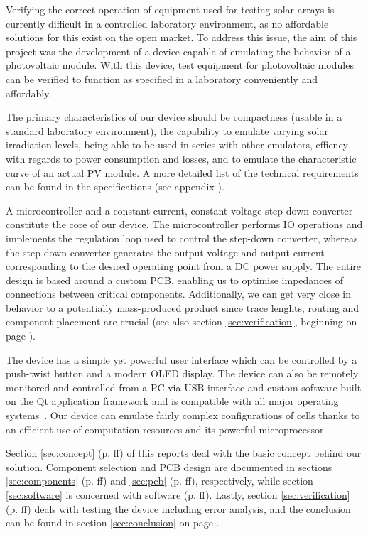 

Verifying the correct operation of equipment  used for testing solar arrays is
currently difficult in  a controlled laboratory environment,  as no affordable
solutions for this exist on the open market. To address this issue, the aim of
this project was the development of a device capable of emulating the behavior
of a  photovoltaic module. With this  device, test equipment  for photovoltaic
modules can be verified to function  as specified in a laboratory conveniently
and affordably.

The primary characteristics  of our device should be compactness  (usable in a
standard  laboratory environment),  the  capability to  emulate varying  solar
irradiation levels,  being able  to be  used in  series with  other emulators,
effiency with  regards to  power consumption  and losses,  and to  emulate the
characteristic  curve of  an actual  PV module. A  more detailed  list of  the
technical  requirements  can be  found  in  the specifications  (see  appendix
). %

A microcontroller and a constant-current, constant-voltage step-down converter
constitute the core of our device.  The microcontroller performs IO operations
and implements  the regulation loop  used to control the  step-down converter,
whereas  the  step-down converter  generates  the  output voltage  and  output
current  corresponding  to  the  desired  operating  point  from  a  DC  power
supply. The  entire design  is  based  around a  custom  PCB,  enabling us  to
optimise impedances of  connections between critical components. Additionally,
we can get very close in behavior to a potentially mass-produced product since
trace lenghts, routing  and component placement are crucial  (see also section
\ref{sec:verification}, beginning on page \pageref{sec:verification}).

The device has a simple yet powerful user interface which can be controlled by
a push-twist button and a modern OLED display. The device can also be remotely
monitored and controlled from a PC via USB interface and custom software built
on the  Qt application framework  and is  compatible with all  major operating
systems~\cite{ref:qt}.  Our  device can emulate fairly  complex configurations
of cells thanks to an efficient  use of computation resources and its powerful
microprocessor.

Section  \ref{sec:concept}   (p.  \pageref{sec:concept}ff)  of   this  reports
deal  with   the  basic  concept  behind   our  solution. Component  selection
and   PCB  design   are  documented   in  sections   \ref{sec:components}  (p.
\pageref{sec:components}ff)   and   \ref{sec:pcb}  (p.   \pageref{sec:pcb}ff),
respectively,  while section  \ref{sec:software}  is  concerned with  software
(p.  \pageref{sec:software}ff).   Lastly, section  \ref{sec:verification}  (p.
\pageref{sec:verification}ff) deals  with testing  the device  including error
analysis, and the  conclusion can be found in  section \ref{sec:conclusion} on
page \pageref{sec:conclusion}.
